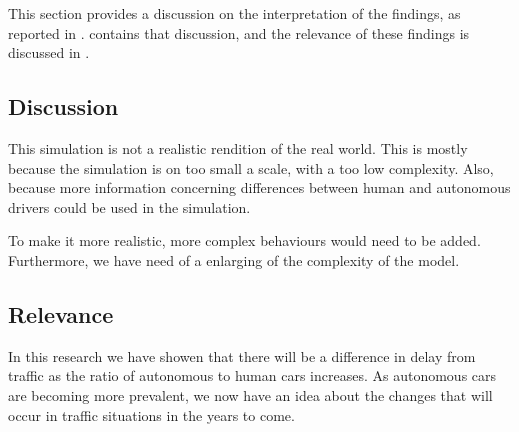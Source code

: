 

This section provides a discussion on the interpretation of the findings, as reported in .  contains that discussion, and the relevance of these findings is discussed in . 

\subsection{Discussion}
\label{sub:conclusion:discussion}




This simulation is not a realistic rendition of the real world. This is mostly because the simulation is on too small a scale, with a too low complexity.
 Also, because more information concerning differences between human and autonomous drivers could be used in the simulation. 

To make it more realistic, more complex behaviours would need to be added. Furthermore, we have need of a enlarging of the complexity of the model.


\subsection{Relevance}
\label{sub:conclusion:relevance}

In this research we have showen that there will be a difference in delay from traffic as the ratio of autonomous to human cars increases. As autonomous cars are becoming more prevalent, we now have an idea about the changes that will occur in traffic situations in the years to come. 

